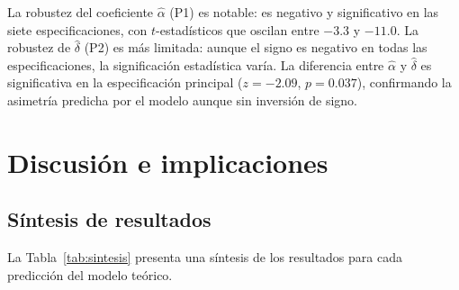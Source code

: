 \documentclass[12pt, a4paper]{article}
\begin{document}
La robustez del coeficiente $\hat{\alpha}$ (P1) es
notable: es negativo y significativo en las siete
especificaciones, con $t$-estadísticos que oscilan
entre $-3.3$ y $-11.0$. La robustez de $\hat{\delta}$
(P2) es más limitada: aunque el signo es negativo en
todas las especificaciones, la significación estadística
varía. La diferencia entre $\hat{\alpha}$ y
$\hat{\delta}$ es significativa en la especificación
principal ($z=-2.09$, $p=0.037$), confirmando la
asimetría predicha por el modelo aunque sin inversión
de signo.

\section{Discusión e implicaciones}

\subsection{Síntesis de resultados}

La Tabla~\ref{tab:sintesis} presenta una síntesis de los
resultados para cada predicción del modelo teórico.
\end{document}
